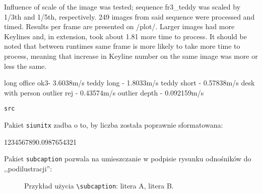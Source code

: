 


Influence of scale of the image was tested; sequence fr3\_teddy was scaled by 1/3th and 1/5th, respectively. 249 images from said sequence were processed and timed. Results per frame are presented on /plot/. Larger images had more Keylines and, in extension, took about 1.81 more time to process. It should be noted that between runtimes same frame is more likely to take more time to process, meaning that increase in Keyline number on the same image was more or less the same.


long office ok3- 3.6038m/s
teddy long - 1.8033m/s
teddy short - 0.57838m/s
desk with person outlier rej - 0.43574m/s
				 outlier depth - 0.092159m/s







\begin{lstlisting}
src
\end{lstlisting}

Pakiet \texttt{siunitx} zadba o to, by liczba została poprawnie sformatowana: \\
\begin{center}
	\num{1234567890.0987654321}
\end{center}


Pakiet \texttt{subcaption} pozwala na umieszczanie w podpisie rysunku odnośników do ,,podilustracji'': \\

\begin{figure}[h]
	\centering
	\begin{subfigure}{0.35\textwidth}
		\centering
		\subcaption{\label{subfigure_a}}
	\end{subfigure}
	\begin{subfigure}{0.35\textwidth}
		\centering
		\subcaption{\label{subfigure_b}}
	\end{subfigure}
	
	\caption{\label{fig:subcaption_example}Przykład użycia \texttt{\textbackslash subcaption}: \protect{} litera A, \protect{} litera B.}
\end{figure}


